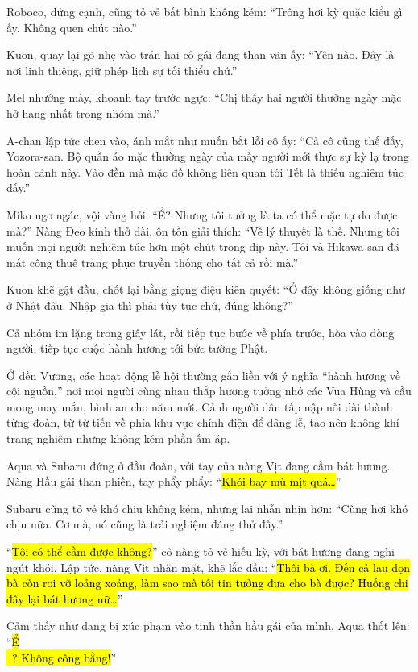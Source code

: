\documentclass[../main.tex]{subfiles}
\begin{document}
Roboco, đứng cạnh, cũng tỏ vẻ bất bình không kém: ``Trông hơi kỳ quặc kiểu gì ấy. Không quen chút nào.''

Kuon, quay lại gõ nhẹ vào trán hai cô gái đang than vãn ấy: ``Yên nào. Đây là nơi linh thiêng, giữ phép lịch sự tối thiểu chứ.''

Mel nhướng mày, khoanh tay trước ngực: ``Chị thấy hai người thường ngày mặc hở hang nhất trong nhóm mà.''

A-chan lập tức chen vào, ánh mắt như muốn bắt lỗi cô ấy: ``Cả cô cũng thế đấy, Yozora-san. Bộ quần áo mặc thường ngày của mấy người mới thực sự kỳ lạ trong hoàn cảnh này. Vào đền mà mặc đồ không liên quan tới Tết là thiếu nghiêm túc đấy.''

Miko ngơ ngác, vội vàng hỏi: ``Ể? Nhưng tôi tưởng là ta có thể mặc tự do được mà?'' Nàng Đeo kính thở dài, ôn tồn giải thích: ``Về lý thuyết là thế. Nhưng tôi muốn mọi người nghiêm túc hơn một chút trong dịp này. Tôi và Hikawa-san đã mất công thuê trang phục truyền thống cho tất cả rồi mà.''

Kuon khẽ gật đầu, chốt lại bằng giọng điệu kiên quyết: ``Ở đây không giống như ở Nhật đâu. Nhập gia thì phải tùy tục chứ, đúng không?''

Cả nhóm im lặng trong giây lát, rồi tiếp tục bước về phía trước, hòa vào dòng người, tiếp tục cuộc hành hương tới bức tường Phật.

Ở đền Vương, các hoạt động lễ hội thường gắn liền với ý nghĩa ``hành hương về cội nguồn,'' nơi mọi người cùng nhau thắp hương tưởng nhớ các Vua Hùng và cầu mong may mắn, bình an cho năm mới. Cảnh người dân tấp nập nối dài thành từng đoàn, từ từ tiến về phía khu vực chính điện để dâng lễ, tạo nên không khí trang nghiêm nhưng không kém phần ấm áp.

Aqua và Subaru đứng ở đầu đoàn, với tay của nàng Vịt đang cầm bát hương. Nàng Hầu gái than phiền, tay phẩy phẩy: ``\hl{Khói bay mù mịt quá\dots}''

Subaru cũng tỏ vẻ khó chịu không kém, nhưng lai nhẫn nhịn hơn: ``Cũng hơi khó chịu nữa. Cơ mà, nó cũng là trải nghiệm đáng thử đấy.''

``\hl{Tôi có thể cầm được không?}'' cô nàng tỏ vẻ hiếu kỳ, với bát hương đang nghi ngút khói. Lập tức, nàng Vịt nhăn mặt, khẽ lắc đầu: ``\hl{Thôi bà ơi. Đến cả lau dọn bà còn rơi vỡ loảng xoảng, làm sao mà tôi tin tưởng đưa cho bà được? Huống chi đây lại bát hương nữ\dots}''

Cảm thấy như đang bị xúc phạm vào tinh thần hầu gái của mình, Aqua thốt lên: ``\hl{Ể\\~{}{}? Không công bằng!}''
\end{document}

